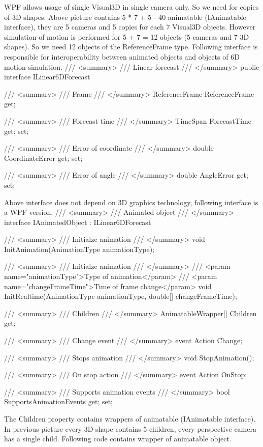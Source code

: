 \documentclass[10pt,journal,compsoc]{IEEEtran}
\begin{document}
WPF allows usage of single Visual3D in single camera only. So we need for copies of 3D shapes. Above picture contains 5 * 7 + 5 - 40 animatable ({IAnimatable interface}), they are 5 cameras and 5 copies for each 7 Visual3D objects. However simulation of motion is performed for 5 + 7 = 12 objects (5 cameras and 7 3D shapes). So we need 12 objects of the {ReferenceFrame} type. Following interface is responsible for interoperability between animated objects and objects of 6D motion simulation.
/// <summary>
/// Linear forecast
/// </summary>
public interface ILinear6DForecast
{
	
	/// <summary>
	/// Frame
	/// </summary>
	ReferenceFrame ReferenceFrame
	{
		get;
	}
	
	
	/// <summary>
	/// Forecast time
	/// </summary>
	TimeSpan ForecastTime
	{
		get;
		set;
	}
	
	/// <summary>
	/// Error of coordinate
	/// </summary>
	double CoordinateError
	{
		get;
		set;
	}
	
	/// <summary>
	/// Error of angle
	/// </summary>
	double AngleError
	{
		get;
		set;
	}
}
Above interface does not depend on 3D graphics technology, following interface is a WPF version.
/// <summary>
/// Animated object
/// </summary>
interface IAnimatedObject : ILinear6DForecast
{
	/// <summary>
	/// Initialze animation
	/// </summary>
	void InitAnimation(AnimationType animationType);
	
	/// <summary>
	/// Initialze animation
	/// </summary>
	/// <param name="animationType">Type of animation</param>
	/// <param name="changeFrameTime">Time of frame change</param>
	void InitRealtime(AnimationType animationType, double[] changeFrameTime);
	
	/// <summary>
	/// Children
	/// </summary>
	AnimatableWrapper[] Children
	{
		get;
	}
	
	/// <summary>
	/// Change event
	/// </summary>
	event Action Change;
	
	/// <summary>
	/// Stops animation
	/// </summary>
	void StopAnimation();
	
	/// <summary>
	/// On stop action
	/// </summary>
	event Action OnStop;
	
	/// <summary>
	/// Supports animation events
	/// </summary>
	bool SupportsAnimationEvents
	{
		get;
		set;
	}
	
}
The Children property contains wrappers of animatable ({IAnimatable interface}). In previous picture every 3D shape contains 5 children, every perspective camera has a single child. Following code contains wrapper of animatable object.
\end{document}
